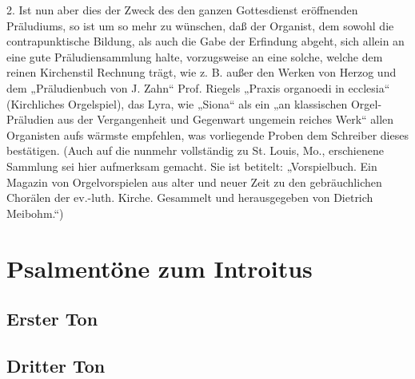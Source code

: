 2. Ist nun aber dies der Zweck des den ganzen Gottesdienst eröffnenden Präludiums, so ist um so mehr zu wünschen, daß der Organist, dem sowohl die contrapunktische Bildung, als auch die Gabe der Erfindung abgeht, sich allein an eine gute Präludiensammlung halte, vorzugsweise an eine solche, welche dem reinen Kirchenstil Rechnung trägt, wie z. B. außer den Werken von Herzog und dem „Präludienbuch von J. Zahn“ Prof. Riegels „Praxis organoedi in ecclesia“ (Kirchliches Orgelspiel), das Lyra, wie „Siona“ als ein „an klassischen Orgel-Präludien aus der Vergangenheit und Gegenwart ungemein reiches Werk“ allen Organisten aufs wärmste empfehlen, was vorliegende Proben dem Schreiber dieses bestätigen. (Auch auf die nunmehr vollständig zu St. Louis, Mo., erschienene Sammlung sei hier aufmerksam gemacht. Sie ist betitelt: „Vorspielbuch. Ein Magazin von Orgelvorspielen aus alter und neuer Zeit zu den gebräuchlichen Chorälen der ev.-luth. Kirche. Gesammelt und herausgegeben von Dietrich Meibohm.“)

\section{Psalmentöne zum Introitus}

\subsection{Erster Ton}




\subsection{Dritter Ton}


